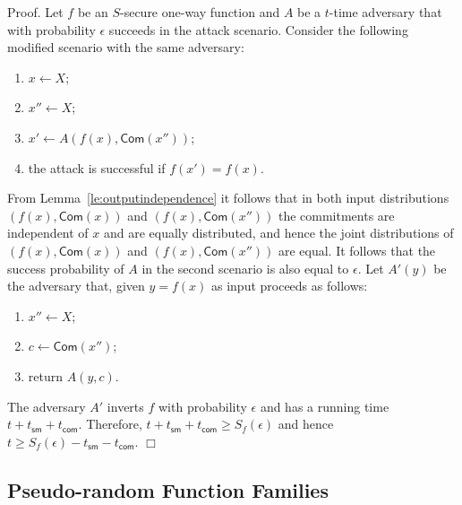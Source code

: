 \documentclass{article}
\newtheorem{lemma}{Lemma}[section]
\newenvironment{proof}{\textsf{Proof}.}{\hfill$\Box$}
\newcommand{\commit}[0]{\mathsf{Com}}
\begin{document}
\begin{proof}
Let $f$ be an $S$-secure one-way function and $A$ be a $t$-time adversary that with probability $\epsilon$ succeeds in the attack scenario.
Consider the following modified scenario with the same adversary:
\begin{enumerate}
\item $x\gets X$;
\item $x''\gets X$;
\item $x'\gets A(f(x),\commit(x''))$;
\item the attack is successful if $f(x')=f(x)$.
\end{enumerate}

\noindent From Lemma~\ref{le:outputindependence} it follows that in both input distributions $(f(x),\commit(x))$ and $(f(x),\commit(x''))$ the commitments are independent of $x$ and are equally distributed, and hence
the joint distributions of $(f(x),\commit(x))$ and $(f(x),\commit(x''))$ are equal. It follows that the success probability of $A$ in the second scenario is also equal to $\epsilon$. Let $A'(y)$ be the adversary that, given $y=f(x)$ as input proceeds as follows:
\begin{enumerate}
\item $x''\gets X$;
\item $c\gets \commit(x'')$;
\item return $A(y,c)$.
\end{enumerate}

\noindent The adversary $A'$ inverts $f$ with probability $\epsilon$ and has a running time $t+t_\mathsf{sm} + t_\mathsf{com}$. Therefore, $t+t_\mathsf{sm} + t_\mathsf{com}\ge S_f(\epsilon)$ and hence $t\ge S_f(\epsilon)- t_\mathsf{sm} - t_\mathsf{com}$.
\end{proof}
\medskip


\subsection{Pseudo-random Function Families}
\end{document}

